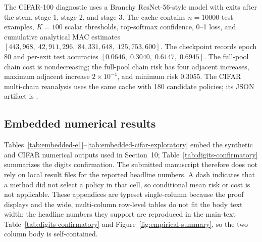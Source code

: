 \documentclass{ieeeaccess}
\begin{document}
The CIFAR-100 diagnostic uses a Branchy ResNet-56-style model with exits after the stem, stage 1, stage 2, and stage 3. The cache contains $n=10000$ test examples, $K=100$ scalar thresholds, top-softmax confidence, 0--1 loss, and cumulative analytical MAC estimates $[443{,}968,\;42{,}911{,}296,\;84{,}331{,}648,\;125{,}753{,}600]$. The checkpoint records epoch 80 and per-exit test accuracies $[0.0646,\;0.3040,\;0.6147,\;0.6945]$. The full-pool chain cost is nondecreasing; the full-pool chain risk has four adjacent increases, maximum adjacent increase $2\times10^{-4}$, and minimum risk $0.3055$. The CIFAR multi-chain reanalysis uses the same cache with 180 candidate policies; its JSON artifact is .

\subsection{Embedded numerical results}

Tables~\ref{tab:embedded-e1}--\ref{tab:embedded-cifar-exploratory} embed the synthetic and CIFAR numerical outputs used in Section~10; Table~\ref{tab:digits-confirmatory} summarizes the digits confirmation. The submitted manuscript therefore does not rely on local result files for the reported headline numbers. A dash indicates that a method did not select a policy in that cell, so conditional mean risk or cost is not applicable. These appendices are typeset single-column because the proof displays and the wide, multi-column row-level tables do not fit the body text width; the headline numbers they support are reproduced in the main-text Table~\ref{tab:digits-confirmatory} and Figure~\ref{fig:empirical-summary}, so the two-column body is self-contained.
\end{document}
